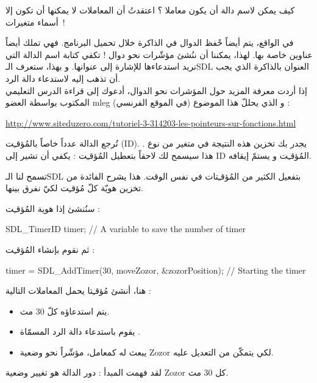 \begin{question}
كيف يمكن لاسم دالة أن يكون معاملا ؟ اعتقدتُ أن المعاملات لا يمكنها أن تكون إلا أسماء متغيرات~!
\end{question}

في الواقع، يتم أيضاً حْفظ الدوال في الذاكرة خلال تحميل البرنامج. فهي تملك أيضاً عناوين خاصة بها. لهذا، يمكننا أن ننُشئ مؤشّرات نحو دوال ! تكفي كتابة اسم الدالة التي نريد استدعاءها للإشارة إلى عنوانها. و بهذا، ستعرف الـ\textenglish{SDL}
العنوان بالذاكرة الذي يجب أن تذهب إليه لاستدعاء دالة الرد.\\
إذا أردت معرفة المزيد حول المؤشرات نحو الدوال، أدعوك إلى قراءة الدرس التعليمي المكتوب بواسطة العضو 
\textenglish{mleg}
(في الموقع الفرنسي) و الذي يحللّ هذا الموضوع :

\url{http://www.siteduzero.com/tutoriel-3-314203-les-pointeurs-sur-fonctions.html}

تُرجع الدالة
عدداً خاصاً بالمُؤقـِت 
(\textenglish{ID}).
يجدر بك تخزين هذه النتيجة في متغير من نوع
.
هذا سيسمح لك لاحقاً بتعطيل المُؤقـِت : يكفي أن تشير إلى 
\textenglish{ID}
المُؤقـِت و يستمّ إيقافه.

تسمح لنا الـ\textenglish{SDL}
بتفعيل الكثير من المُؤقـِتات في نفس الوقت. هذا يشرح الفائدة من تخزين هويّة كلّ مُؤقـِت لكيّ نفرق بينها.

سنُنشئ إذا هوية المُؤقـِت :

\begin{Csource}
SDL_TimerID timer; // A variable to save the number of timer
\end{Csource}

ثم نقوم بإنشاء المُؤقـِت :

\begin{Csource}
timer = SDL_AddTimer(30, moveZozor, &zozorPosition); // Starting the timer 
\end{Csource}

هنا، أنشئ مُؤقـِتا يحمل المعاملات التالية :

\begin{itemize}
	\item يتم استدعاؤه كلّ 30 مث.
	\item يقوم باستدعاء دالة الرد المسمّاة 
	.
	\item يبعث له كمعامل، مؤشّراً نحو وضعية
	\textenglish{Zozor}
	لكي يتمكّن من التعديل عليه.
\end{itemize}

لقد فهمت المبدأ : دور الدالة
هو تغيير وضعية
\textenglish{Zozor}
كل 30 مث.

